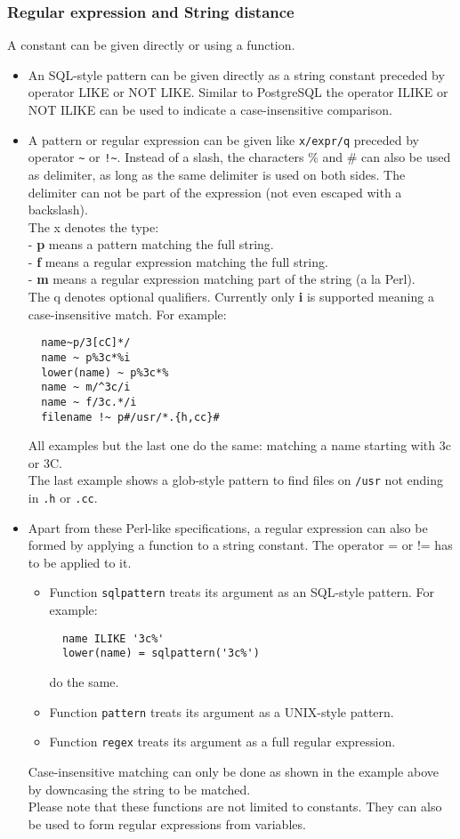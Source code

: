 \subsubsection{\label{TAQL:REGEXCONST}Regular expression and String distance}
A  constant can be given
directly or using a function.
\begin{itemize}
\item An SQL-style pattern can be given directly as a string constant
  preceded by operator LIKE or NOT LIKE. Similar to PostgreSQL the
  operator ILIKE or NOT ILIKE can be used to indicate a
  case-insensitive comparison.
\item A pattern or regular expression can be given like
  \texttt{x/expr/q} preceded by operator \verb+~+ or \verb+!~+.
  Instead of a slash, the characters \% and \# can also be used as
  delimiter, as long as the same delimiter is used on both sides.
  The delimiter can not be part of the expression 
  (not even escaped with a backslash).
  \\The x denotes the type:
  \\- \textbf{p} means a pattern matching the full string.
  \\- \textbf{f} means a regular expression matching the full string.
  \\- \textbf{m} means a regular expression matching part of the string (a la Perl).
  \\The q denotes optional qualifiers. Currently only \textbf{i} is supported
  meaning a case-insensitive match. For example:
\begin{verbatim}
  name~p/3[cC]*/
  name ~ p%3c*%i
  lower(name) ~ p%3c*%
  name ~ m/^3c/i
  name ~ f/3c.*/i
  filename !~ p#/usr/*.{h,cc}#
\end{verbatim}
  All examples but the last one do the same: matching a name starting with
  3c or 3C.
  \\The last example shows a glob-style pattern to find files on
  \texttt{/usr} not ending in \texttt{.h} or \texttt{.cc}.
\item Apart from these Perl-like specifications, a regular expression can
  also be formed by applying a function to a string constant. The operator
  = or != has to be applied to it.
  \begin{itemize}
  \item Function \texttt{sqlpattern} treats its argument as an SQL-style pattern.
    For example:
\begin{verbatim}
  name ILIKE '3c%'
  lower(name) = sqlpattern('3c%')
\end{verbatim}
    do the same.
  \item Function \texttt{pattern} treats its argument as a UNIX-style pattern.
  \item Function \texttt{regex} treats its argument as a full regular expression.
  \end{itemize}
  Case-insensitive matching can only be done as shown in the example
  above by downcasing the string to be matched.
  \\Please note that these functions are not limited to constants. They can
  also be used to form regular expressions from variables.
\end{itemize}

